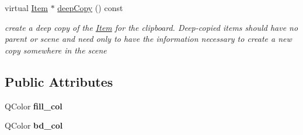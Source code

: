 \begin{DoxyCompactItemize}
\item 
virtual \hyperlink{classprim_1_1Item}{Item} $\ast$ \hyperlink{classprim_1_1AFMNode_a5d6f53c4a6653a4a8aa2fd275b0e4302}{deep\+Copy} () const \hypertarget{classprim_1_1AFMNode_a5d6f53c4a6653a4a8aa2fd275b0e4302}{}\label{classprim_1_1AFMNode_a5d6f53c4a6653a4a8aa2fd275b0e4302}

\begin{DoxyCompactList}\small\item\em create a deep copy of the \hyperlink{classprim_1_1Item}{Item} for the clipboard. Deep-\/copied items should have no parent or scene and need only to have the information necessary to create a new copy somewhere in the scene \end{DoxyCompactList}\end{DoxyCompactItemize}
\subsection*{Public Attributes}
\begin{DoxyCompactItemize}
\item 
Q\+Color {\bfseries fill\+\_\+col}\hypertarget{classprim_1_1AFMNode_afbd02d2180f374bf8fda5c602388f0fb}{}\label{classprim_1_1AFMNode_afbd02d2180f374bf8fda5c602388f0fb}

\item 
Q\+Color {\bfseries bd\+\_\+col}\hypertarget{classprim_1_1AFMNode_afcdc6902ffbff4db7eabc679e71315c8}{}\label{classprim_1_1AFMNode_afcdc6902ffbff4db7eabc679e71315c8}

\end{DoxyCompactItemize}
